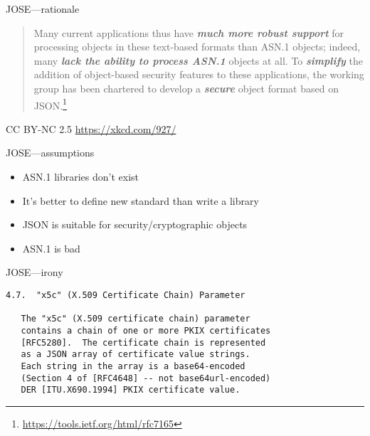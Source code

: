 \documentclass[ignorenonframetext,aspectratio=43]{beamer}
\providecommand{\tightlist}{%
  \setlength{\itemsep}{0pt}\setlength{\parskip}{0pt}}
\begin{document}
\begin{frame}{JOSE---rationale}
\begin{quotation}
\Large
  Many current applications thus have {\bf \em much more robust support} for
  processing objects in these text-based formats than ASN.1 objects;
  indeed, many {\bf \em lack the ability to process ASN.1} objects at all.  To
  {\bf \em simplify} the addition of object-based security features to these
  applications, the %
  working group has been chartered to develop a {\bf \em secure} object format
  based on JSON.\footnote[frame]{
    \url{https://tools.ietf.org/html/rfc7165}}
\end{quotation}
\end{frame}

\begin{frame}[plain]
\begin{center}
\end{center}
\tiny CC BY-NC 2.5 \url{https://xkcd.com/927/}
\end{frame}


\begin{frame}{JOSE---assumptions}
\begin{itemize}
\tightlist
\item ASN.1 libraries don't exist
\item It's better to define new standard than write a library
\item JSON is suitable for security/cryptographic objects
\item ASN.1 is bad
\end{itemize}
\end{frame}

\begin{frame}[fragile]{JOSE---irony}
\begin{verbatim}
4.7.  "x5c" (X.509 Certificate Chain) Parameter

   The "x5c" (X.509 certificate chain) parameter
   contains a chain of one or more PKIX certificates
   [RFC5280].  The certificate chain is represented
   as a JSON array of certificate value strings.
   Each string in the array is a base64-encoded
   (Section 4 of [RFC4648] -- not base64url-encoded)
   DER [ITU.X690.1994] PKIX certificate value.
\end{verbatim}
\end{frame}
\end{document}
